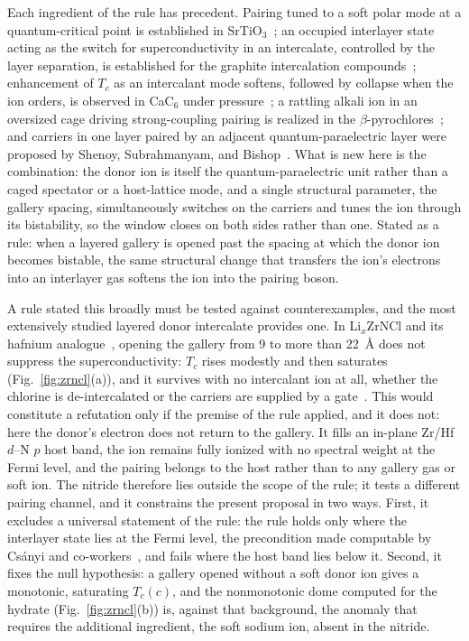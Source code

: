 \documentclass[aps,10pt,preprint,superscriptaddress,floatfix]{revtex4-2}
\begin{document}
Each ingredient of the rule has precedent. Pairing tuned to a soft polar mode at a quantum-critical
point is established in SrTiO$_3$~\cite{Edge2015,Muller1979QuantumParaelectric,vanderMarel2019SrTiO3,
Yu2022QuantumParaelectric}; an occupied interlayer state acting as the switch for superconductivity
in an intercalate, controlled by the layer separation, is established for the graphite
intercalation compounds~\cite{Csanyi2005,OhtomoHwang2004}; enhancement of $T_c$ as an intercalant
mode softens, followed by collapse when the ion orders, is observed in CaC$_6$ under
pressure~\cite{Gauzzi2007}; a rattling alkali ion in an oversized cage driving strong-coupling
pairing is realized in the
$\beta$-pyrochlores~\cite{Yonezawa2004KOs2O6,Hiroi2012RattlingReview}; and carriers in one layer
paired by an adjacent quantum-paraelectric layer were proposed by Shenoy, Subrahmanyam, and
Bishop~\cite{Shenoy1997}. What is new here is the combination: the donor ion is itself the
quantum-paraelectric unit rather than a caged spectator or a host-lattice mode, and a single
structural parameter, the gallery spacing, simultaneously switches on the carriers and tunes the
ion through its bistability, so the window closes on both sides rather than one. Stated as a rule:
when a layered gallery is opened past the spacing at which the donor ion becomes bistable, the same
structural change that transfers the ion's electrons into an interlayer gas softens the ion into
the pairing boson.

A rule stated this broadly must be tested against counterexamples, and the most extensively studied
layered donor intercalate provides one. In Li$_x$ZrNCl and its hafnium
analogue~\cite{Yamanaka1998}, opening the gallery from 9 to more than 22~\AA{} does not suppress
the superconductivity: $T_c$ rises modestly and then saturates
(Fig.~\ref{fig:zrncl}(a)), and it survives with no intercalant ion at all, whether the chlorine is
de-intercalated or the carriers are supplied by a gate~\cite{Nakagawa2021}. This would constitute
a refutation only if the premise of the rule applied, and it does not: here the donor's electron
does not return to the gallery. It fills an in-plane Zr/Hf $d$--N $p$ host band, the ion remains
fully ionized with no spectral weight at the Fermi level, and the pairing belongs to the host
rather than to any gallery gas or soft ion. The nitride therefore lies outside the scope of the
rule; it tests a different pairing channel, and it constrains the present proposal in two ways.
First, it excludes a universal statement of the rule: the rule holds only where the interlayer
state lies at the Fermi level, the precondition made computable by Cs\'anyi and
co-workers~\cite{Csanyi2005}, and fails where the host band lies below it. Second, it fixes the
null hypothesis: a gallery opened without a soft donor ion gives a monotonic, saturating $T_c(c)$,
and the nonmonotonic dome computed for the hydrate (Fig.~\ref{fig:zrncl}(b)) is, against that
background, the anomaly that requires the additional ingredient, the soft sodium ion, absent in the
nitride.
\end{document}
